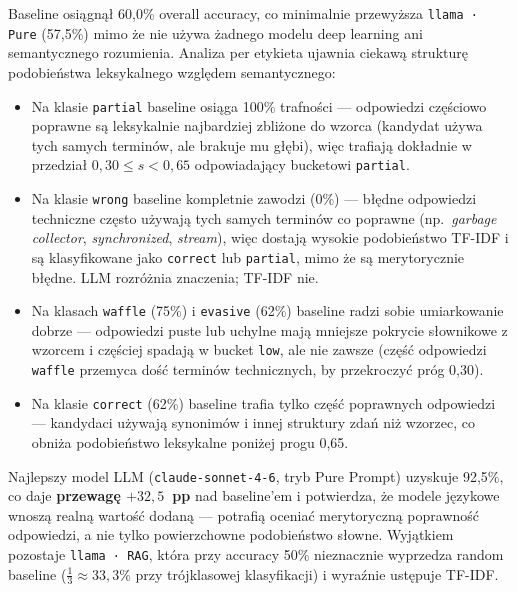 \documentclass[12pt, a4paper]{article}
\begin{document}
Baseline osiągnął 60,0\% overall accuracy, co minimalnie przewyższa
\texttt{llama · Pure} (57,5\%) mimo że nie używa żadnego modelu deep
learning ani semantycznego rozumienia. Analiza per etykieta ujawnia
ciekawą strukturę podobieństwa leksykalnego względem semantycznego:

\begin{itemize}
    \item Na klasie \texttt{partial} baseline osiąga 100\% trafności —
          odpowiedzi częściowo poprawne są leksykalnie najbardziej zbliżone
          do wzorca (kandydat używa tych samych terminów, ale brakuje
          mu głębi), więc trafiają dokładnie w przedział
          $0{,}30 \leq s < 0{,}65$ odpowiadający bucketowi \texttt{partial}.
    \item Na klasie \texttt{wrong} baseline kompletnie zawodzi (0\%) —
          błędne odpowiedzi techniczne często używają tych samych
          terminów co poprawne (np.\ \textit{garbage collector},
          \textit{synchronized}, \textit{stream}), więc dostają wysokie
          podobieństwo TF-IDF i są klasyfikowane jako \texttt{correct}
          lub \texttt{partial}, mimo że są merytorycznie błędne.
          LLM rozróżnia znaczenia; TF-IDF nie.
    \item Na klasach \texttt{waffle} (75\%) i \texttt{evasive} (62\%)
          baseline radzi sobie umiarkowanie dobrze — odpowiedzi puste
          lub uchylne mają mniejsze pokrycie słownikowe z wzorcem
          i częściej spadają w bucket \texttt{low}, ale nie zawsze
          (część odpowiedzi \texttt{waffle} przemyca dość terminów
          technicznych, by przekroczyć próg 0,30).
    \item Na klasie \texttt{correct} (62\%) baseline trafia tylko
          część poprawnych odpowiedzi — kandydaci używają synonimów
          i innej struktury zdań niż wzorzec, co obniża podobieństwo
          leksykalne poniżej progu 0,65.
\end{itemize}

Najlepszy model LLM (\texttt{claude-sonnet-4-6}, tryb Pure Prompt) uzyskuje
92,5\%, co daje \textbf{przewagę $+32{,}5$~pp} nad baseline'em i potwierdza,
że modele językowe wnoszą realną wartość dodaną — potrafią oceniać
merytoryczną poprawność odpowiedzi, a nie tylko powierzchowne podobieństwo
słowne. Wyjątkiem pozostaje \texttt{llama · RAG}, która przy accuracy 50\%
nieznacznie wyprzedza random baseline ($\frac{1}{3} \approx 33{,}3\%$
przy trójklasowej klasyfikacji) i wyraźnie ustępuje TF-IDF.
\end{document}
